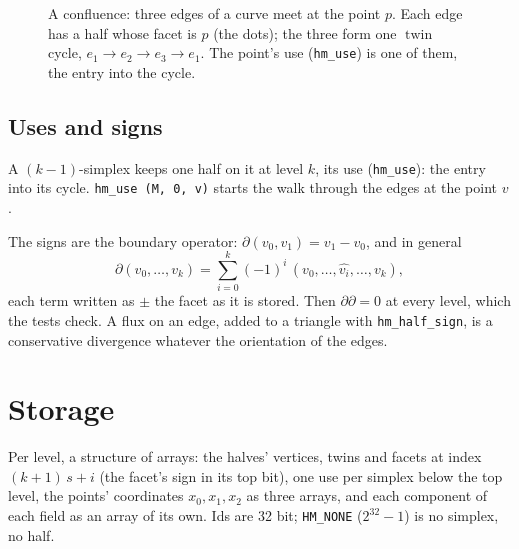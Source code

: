 \documentclass[10pt,a4paper]{article}
\theoremstyle{definition}
\newcommand{\fn}[1]{\texttt{#1}}
\newcommand{\twin}{\operatorname{twin}}
\begin{document}
\begin{figure}[H]
\centering
{}
\caption{A confluence: three edges of a curve meet at the point $p$. Each
  edge has a half whose facet is $p$ (the dots); the three form one $\twin$
  cycle, $e_1 \to e_2 \to e_3 \to e_1$.
  The point's use (\fn{hm\_use}) is one of them, the entry into the
  cycle.}
\label{fig:junction}
\end{figure}

\subsection{Uses and signs}

A $(k-1)$-simplex keeps one half on it at level $k$, its use
(\fn{hm\_use}): the entry into its cycle. \fn{hm\_use (M, 0, v)} starts the
walk through the edges at the point $v$.

The signs are the boundary operator: $\partial (v_0, v_1) = v_1 - v_0$, and
in general
\[
  \partial (v_0, \ldots, v_k) = \sum_{i=0}^{k} (-1)^i\, (v_0, \ldots,
    \widehat{v_i}, \ldots, v_k),
\]
each term written as $\pm$ the facet as it is stored. Then $\partial
\partial = 0$ at every level, which the tests check. A flux on an edge,
added to a triangle with \fn{hm\_half\_sign}, is a conservative divergence
whatever the orientation of the edges.

\section{Storage}
\label{sec:storage}

Per level, a structure of arrays: the halves' vertices, twins and facets at
index $(k + 1)\,s + i$ (the facet's sign in its top bit), one use per
simplex below the top level, the points' coordinates $x_0, x_1, x_2$ as
three arrays, and each component of each field as an array of its own. Ids
are 32 bit; \fn{HM\_NONE} ($2^{32} - 1$) is no simplex, no half.
\end{document}
